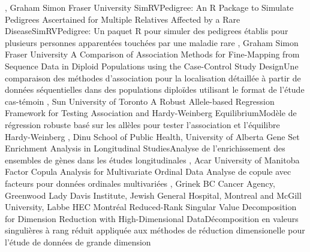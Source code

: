 {
,  {Graham}
{Simon Fraser University}
}
{SimRVPedigree: An R Package to Simulate Pedigrees Ascertained for Multiple Relatives Affected by a Rare Disease}{SimRVPedigree: Un paquet R pour simuler des pedigrees établis pour plusieurs personnes apparentées touchées par une maladie rare}
{\bubbleE \enspace \screenE}
{
,  {Graham}
{Simon Fraser University}
}
{A Comparison of Association Methods for Fine-Mapping from Sequence Data in Diploid Populations using the Case-Control Study Design}{Une comparaison des méthodes d'association pour la localisation détaillée à partir de données séquentielles dans des populations diploïdes utilisant le format de l'étude cas-témoin}
{\bubbleE \enspace \screenE}
{
,  {Sun}
{University of Toronto}
}
{A Robust Allele-based Regression Framework for Testing Association and Hardy-Weinberg Equilibrium}{Modèle de régression robuste basé sur les allèles pour tester l’association et l’équilibre Hardy-Weinberg}
{\bubbleE \enspace \screenE}
{
,  {Dinu}
{School of Public Health, University of Alberta}
}
{Gene Set Enrichment Analysis in Longitudinal Studies}{Analyse de l’enrichissement des ensembles de gènes dans les études longitudinales}
{\bubbleE \enspace \screenE}
{
,  {Acar}
{University of Manitoba}
}
{Factor Copula Analysis for Multivariate Ordinal Data }{Analyse de copule avec facteurs pour données ordinales multivariées}
{\bubbleE \enspace \screenE}
{
,  {Grinek}
{BC Cancer Agency},  {Greenwood}
{Lady Davis Institute, Jewish General Hospital, Montreal and McGill University},  {Labbe}
{HEC Montréal}
}
{Reduced-Rank Singular Value Decomposition for Dimension Reduction with High-Dimensional Data}{Décomposition en valeurs singulières à rang réduit appliquée aux méthodes de réduction dimensionelle pour l'étude de données de grande dimension}
{\bubbleE \enspace \screenE}


